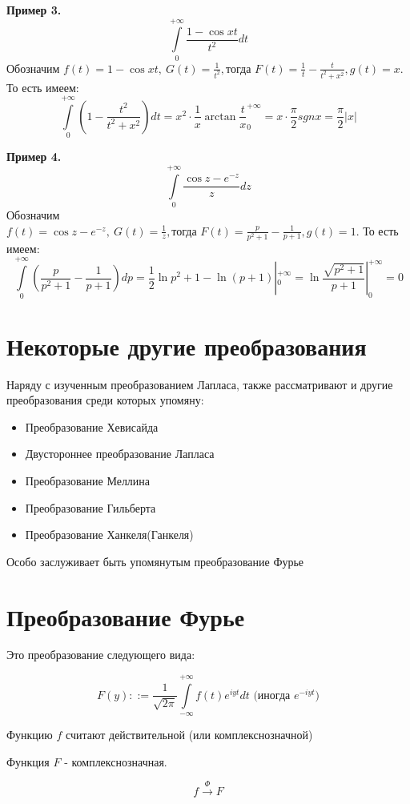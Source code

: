 \documentclass[a4paper, 12pt]{report}
\begin{document}
\textbf{Пример 3.}
\[
\int \limits_{0}^{+\infty}\frac{1-\cos{xt}}{t^2}dt
\]
Обозначим \(f(t) = 1-\cos{xt}, \: G(t) = \frac{1}{t^2},\text{тогда }F(t) = \frac{1}{t}-\frac{t}{t^2 + x^2}, g(t) = x\). То есть имеем:
\[
\int \limits_{0}^{+\infty} (1-\frac{t^2}{t^2 + x^2})dt = x^2 \cdot \frac{1}{x}\arctan{\frac{t}{x}}_{0}^{+\infty} = x \cdot \frac{\pi}{2} sgn x = \frac{\pi}{2} |x|
\]

\textbf{Пример 4.}
\[
\int \limits_{0}^{+\infty}\frac{\cos{z}-e^{-z}}{z}dz
\]
Обозначим \(f(t) = \cos{z}-e^{-z}, \: G(t) = \frac{1}{z},\text{тогда }F(t) = \frac{p}{p^2 + 1} - \frac{1}{p + 1}, g(t) = 1\). То есть имеем:
\[
\int \limits_{0}^{+\infty} (\frac{p}{p^2 + 1} - \frac{1}{p + 1})dp = \frac{1}{2}\ln{p^2 + 1} - \ln(p+1)|_{0}^{+\infty} = \ln {\frac{\sqrt{p^2 + 1}}{p+1}} | _{0}^{+\infty} = 0
\]

\section{Некоторые другие преобразования}

Наряду с изученным преобразованием Лапласа, также рассматривают и другие преобразования среди которых упомяну:

\begin{itemize}
    \item Преобразование Хевисайда	
    \item Двустороннее преобразование Лапласа		
    \item  Преобразование Меллина		
    \item   Преобразование Гильберта		
    \item Преобразование Ханкеля(Ганкеля)	
\end{itemize}


Особо заслуживает быть упомянутым преобразование Фурье

\section{Преобразование Фурье}

Это преобразование следующего вида:

\[
	F(y)  ::= \frac{1}{\sqrt{2\pi}}\int\limits_{-\infty}^{+\infty}f(t)e^{iyt}dt\text{  (иногда } e^{-iyt} \text{)}
\]

Функцию \(f\) считают действительной (или комплекснозначной)

Функция \(F\) - комплекснозначная.

\[
    f \xrightarrow{\Phi} F
\]
\end{document}
